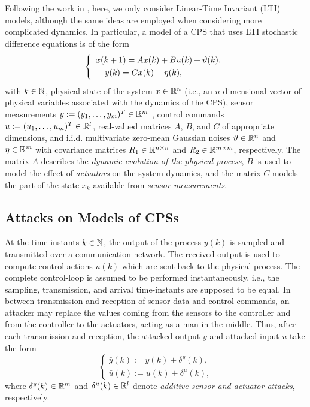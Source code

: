 {Following the work in \cite{CPSAttacksAgainstPCS,Urbina2016,CPSDetectingIntegrityAttacksScada,CPSIntegrityAttacks,Carlos_Justin1,Carlos_Justin2,ReachableSets}, here, we only consider Linear-Time Invariant (LTI) models, although the same ideas are employed when considering more complicated dynamics. In particular, a model of a CPS that uses LTI stochastic difference equations is of the form
\begin{equation}
\left\{
\begin{array}{ll}
{x}({k+1}) = Ax(k) + B u(k) + \vartheta(k),  \label{1} \\[1mm]
\hspace{3.8mm} y(k) = Cx(k) + \eta(k),
\end{array}
\right.
\end{equation}
with $k\in \mathbb{N}$, physical state of the system $x \in \mathbb{R}^n$ (i.e., an $n$-dimensional vector of physical variables associated with the dynamics of the CPS), sensor measurements $y := (y_1,\ldots,y_m)^T \in \mathbb{R}^m$ , control commands $u := (u_1,\ldots,u_m)^T \in \mathbb{R}^l$, real-valued matrices $A$, $B$, and $C$ of appropriate dimensions, and i.i.d. multivariate zero-mean Gaussian noises $\vartheta \in \mathbb{R}^n$ and $\eta \in \mathbb{R}^m$ with covariance matrices $R_{1} \in \mathbb{R}^{n \times n}$ and $R_2 \in \mathbb{R}^{m \times m}$, respectively. The matrix $A$ describes the \emph{dynamic evolution of the physical process}, $B$ is used to model the effect of \emph{actuators} on the system dynamics, and the matrix $C$ models the part of the state $x_k$ available from \emph{sensor measurements}.

\subsection{Attacks on Models of CPSs}
\label{sec:CPSRobustness:AttacksOnModels} 
At the time-instants $k \in \mathbb{N}$, the output of the process $y(k)$ is sampled and transmitted over a communication network. The received output is used to compute control actions $u(k)$ which are sent back to the physical process. The complete control-loop is assumed to be performed instantaneously, i.e., the sampling, transmission, and arrival time-instants are supposed to be equal.
In between transmission and reception of sensor data and control commands, an attacker may replace the values coming from the sensors to the controller and from the controller to the actuators, acting as a {man-in-the-middle}. Thus, after each transmission and reception, the attacked output $\bar{y}$ and attacked input $\bar{u}$ take the form
\begin{equation}
\left\{
\begin{array}{ll}
\bar{y}(k) := y(k) + \delta^y(k) 
, \label{3}\\[1mm]
\bar{u}(k) := u(k) + \delta^u(k),
\end{array}\right.
\end{equation}
where $\delta^y(k) \in \mathbb{R}^m$ and $\delta^u(k) \in \mathbb{R}^l$ denote \emph{additive sensor and actuator attacks}, respectively.

}

